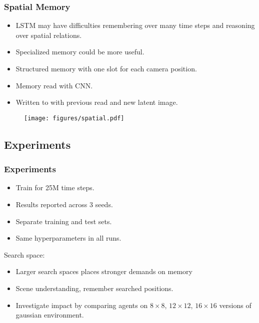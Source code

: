 \begin{frame}
    \frametitle{Spatial Memory}

    \begin{itemize}
        \item LSTM may have difficulties remembering over many time steps and reasoning over spatial relations.
        \item Specialized memory could be more useful.
        \item Structured memory with one slot for each camera position.
        \item Memory read with CNN.
        \item Written to with previous read and new latent image.
    \end{itemize}

    \begin{figure}
        \centering
        \texttt{[image: figures/spatial.pdf]}
    \end{figure}
\end{frame}

\subsection{Experiments}

\begin{frame}
    \frametitle{Experiments}

    \begin{itemize}
        \item Train for 25M time steps.
        \item Results reported across 3 seeds.
        \item Separate training and test sets.
        \item Same hyperparameters in all runs.
    \end{itemize}

    Search space:

    \begin{itemize}
        \item Larger search spaces places stronger demands on memory
        \item Scene understanding, remember searched positions.
        \item Investigate impact by comparing agents on \(8 \times 8\), \(12 \times 12\), \(16 \times 16\) versions of gaussian environment.
    \end{itemize}
\end{frame}

